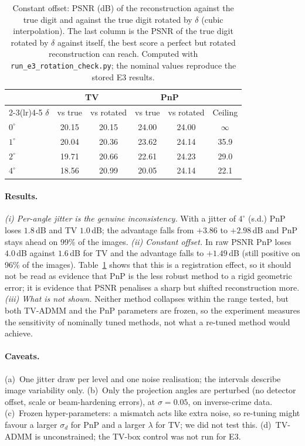 \begin{table}[htbp]
\centering\small\setlength{\tabcolsep}{6pt}
\caption{Constant offset: PSNR (dB) of the reconstruction against the true digit and against the true digit rotated by $\delta$ (cubic interpolation). The last column is the PSNR of the true digit rotated by $\delta$ against itself, the best score a perfect but rotated reconstruction can reach.
Computed with \texttt{run\_e3\_rotation\_check.py}; the nominal values reproduce the stored E3 results.}\label{tab:e3rot}
\begin{tabular}{lccccc}
\toprule
 & \multicolumn{2}{c}{TV} & \multicolumn{2}{c}{PnP} & \\
\cmidrule(lr){2-3}\cmidrule(lr){4-5}
$\delta$ & vs true & vs rotated & vs true & vs rotated & Ceiling \\
\midrule
$0^\circ$ & 20.15 & 20.15 & 24.00 & 24.00 & $\infty$ \\
$1^\circ$ & 20.04 & 20.36 & 23.62 & 24.14 & 35.9 \\
$2^\circ$ & 19.71 & 20.66 & 22.61 & 24.23 & 29.0 \\
$4^\circ$ & 18.56 & 20.99 & 20.05 & 24.14 & 22.1 \\
\bottomrule
\end{tabular}
\end{table}

\paragraph{Results.}
\emph{(i) Per-angle jitter is the genuine inconsistency.} With a jitter of $4^\circ$ (s.d.) PnP loses $1.8$\,dB and TV $1.0$\,dB; the advantage falls from $+3.86$ to $+2.98$\,dB and PnP stays ahead on 99\% of the images.
\emph{(ii) Constant offset.} In raw PSNR PnP loses $4.0$\,dB against $1.6$\,dB for TV and the advantage falls to $+1.49$\,dB (still positive on 96\% of the images). Table~\ref{tab:e3rot} shows that this is a registration effect, so it
should not be read as evidence that PnP is the less robust method to a rigid geometric error; it is evidence that PSNR penalises a sharp but shifted reconstruction more.
\emph{(iii) What is not shown.} Neither method collapses within the range tested, but both TV-ADMM and the PnP parameters are frozen, so the experiment measures the sensitivity of nominally tuned methods, not what a re-tuned method would achieve.

\paragraph{Caveats.}
(a)~One jitter draw per level and one noise realisation; the intervals describe image variability only. (b)~Only the projection angles are perturbed (no detector offset, scale or beam-hardening errors), at $\sigma=0.05$,
on inverse-crime data. (c)~Frozen hyper-parameters: a mismatch acts like extra noise, so re-tuning might favour a larger $\sigma_d$ for PnP and a larger $\lambda$ for TV; we did not test this. (d)~TV-ADMM is unconstrained; the TV-box control
was not run for E3.


